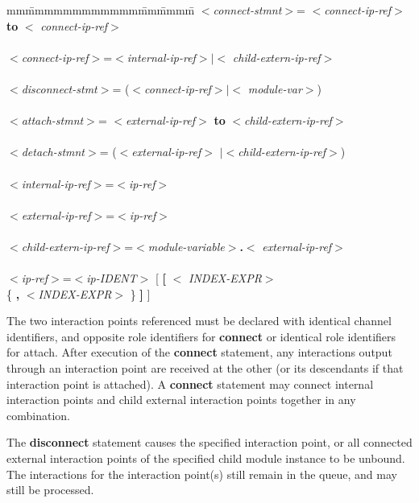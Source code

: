 \begin{tabbing}
mm\=mmmmmmmmmmmm\=mm\=mmmm\=\+\kill
$<${\em connect-stmnt}$>$\>= $<${\em connect-ip-ref}$>$ {\bf to} $<${\em
connect-ip-ref}$>$\\
\mbox{}\\
$<${\em connect-ip-ref}$>$\>=\>$<${\em internal-ip-ref}$>|<${\em
child-extern-ip-ref}$>$\\
\mbox{}\\
$<${\em disconnect-stmt}$>$\>= ($<${\em connect-ip-ref}$>|<${\em
module-var}$>$)\\
\mbox{}\\
$<${\em attach-stmnt}$>$\>= $<${\em external-ip-ref}$>$
{\bf to} $<${\em child-extern-ip-ref}$>$\\
\mbox{}\\
$<${\em detach-stmnt}$>$\>= ($<${\em external-ip-ref}$>$
$|<${\em child-extern-ip-ref}$>$)\\
\mbox{}\\
$<${\em internal-ip-ref}$>$\>=\>$<${\em ip-ref}$>$\\
\mbox{}\\
$<${\em external-ip-ref}$>$\>=\>$<${\em ip-ref}$>$\\
\mbox{}\\
$<${\em child-extern-ip-ref}$>$\>=\>$<${\em module-variable}$>${\bf .}$<${\em
external-ip-ref}$>$\\
\mbox{}\\
$<${\em ip-ref}$>$\>=\>$<${\em ip-IDENT}$>$ [ {\bf [} $<${\em
INDEX-EXPR}$>$\\
\>\>\>\{ {\bf ,} $<${\em INDEX-EXPR}$>$ \} {\bf ]} ]\\
\end{tabbing}

The two interaction points referenced must be declared
with identical channel identifiers, and opposite role
identifiers for {\bf connect} or identical role identifiers for
attach. After execution of the {\bf connect} statement, any
interactions output through an interaction point are
received at the other (or its descendants if that
interaction point is attached). A {\bf connect} statement may
connect internal interaction points and child external
interaction points together in any combination.
 
The {\bf disconnect} statement causes the specified interaction
point, or all connected external interaction points of the
specified child module instance to be unbound. The
interactions for the interaction point(s) still remain in
the queue, and may still be processed.
 
